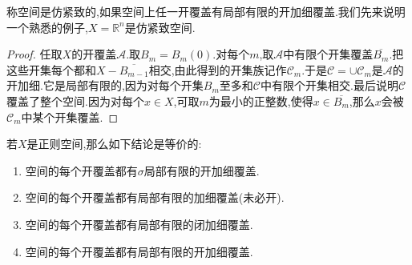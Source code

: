 称空间是仿紧致的,如果空间上任一开覆盖有局部有限的开加细覆盖.我们先来说明一个熟悉的例子,$X=\mathbb{R}^n$是仿紧致空间.
\begin{proof}
	
   任取$X$的开覆盖$\mathscr{A}$.取$B_m=B_m(0)$.对每个$m$,取$\mathscr{A}$中有限个开集覆盖$\overline{B_m}$.把这些开集每个都和$X-\overline{B_{m-1}}$相交,由此得到的开集族记作$\mathscr{C}_m$.于是$\mathscr{C}=\cup\mathscr{C}_m$是$\mathscr{A}$的开加细.它是局部有限的,因为对每个开集$B_m$至多和$\mathscr{C}$中有限个开集相交.最后说明$\mathscr{C}$覆盖了整个空间.因为对每个$x\in X$,可取$m$为最小的正整数,使得$x\in\overline{B_m}$,那么$x$会被$\mathscr{C}_m$中某个开集覆盖.
\end{proof}

若$X$是正则空间,那么如下结论是等价的:
\begin{enumerate}
	\item 空间的每个开覆盖都有$\sigma$局部有限的开加细覆盖.
	\item 空间的每个开覆盖都有局部有限的加细覆盖(未必开).
	\item 空间的每个开覆盖都有局部有限的闭加细覆盖.
	\item 空间的每个开覆盖都有局部有限的开加细覆盖.
\end{enumerate}
